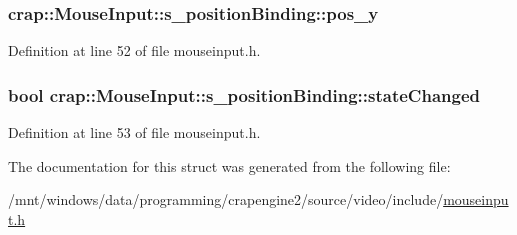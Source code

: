 \subsubsection[{pos\+\_\+y}]{ crap\+::\+Mouse\+Input\+::s\+\_\+position\+Binding\+::pos\+\_\+y}\label{structcrap_1_1_mouse_input_1_1s__position_binding_ad05b14a8fcc7b2e2f15923888b2683a2}


Definition at line 52 of file mouseinput.\+h.

\hypertarget{structcrap_1_1_mouse_input_1_1s__position_binding_a582ebaa42d7112f1703bba3150a57566}{}
\subsubsection[{state\+Changed}]{\setlength{\rightskip}{0pt plus 5cm}bool crap\+::\+Mouse\+Input\+::s\+\_\+position\+Binding\+::state\+Changed}\label{structcrap_1_1_mouse_input_1_1s__position_binding_a582ebaa42d7112f1703bba3150a57566}


Definition at line 53 of file mouseinput.\+h.



The documentation for this struct was generated from the following file\+:\begin{DoxyCompactItemize}
\item 
/mnt/windows/data/programming/crapengine2/source/video/include/\hyperlink{mouseinput_8h}{mouseinput.\+h}\end{DoxyCompactItemize}
